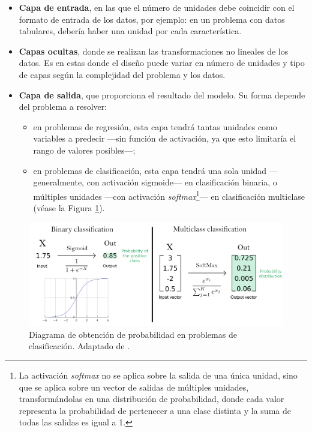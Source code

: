 \begin{itemize}

    \item \textbf{Capa de entrada}, en las que el número de unidades debe coincidir con el formato de entrada 
    de los datos, por ejemplo: en un problema con datos tabulares, debería haber una unidad por cada 
    característica.
    
    \item \textbf{Capas ocultas}, donde se realizan las transformaciones no lineales de los datos. Es en estas 
    donde el diseño puede variar en número de unidades y tipo de capas según la complejidad del problema y los 
    datos.
    
    \item \textbf{Capa de salida}, que proporciona el resultado del modelo. Su forma depende del problema a 
    resolver: 
    
    \begin{itemize}
        
        \item en problemas de regresión, esta capa tendrá tantas unidades como variables a predecir ---sin 
        función de activación, ya que esto limitaría el rango de valores posibles---;
        
        \item en problemas de clasificación, esta capa tendrá una sola unidad ---generalmente, con activación 
        sigmoide--- en clasificación binaria, o múltiples unidades ---con activación 
        \textit{softmax}\footnote{
            La activación \textit{softmax} no se aplica sobre la salida de una única unidad, sino que se 
            aplica sobre un vector de salidas de múltiples unidades, transformándolas en una distribución de 
            probabilidad, donde cada valor representa la probabilidad de pertenecer a una clase distinta y la 
            suma de todas las salidas es igual a 1.
        }--- en clasificación multiclase (véase la Figura \ref{fig:activation_func_classification}).
    \end{itemize}

\end{itemize}

\begin{figure}[h]
    \centering
    \includegraphics[width=\textwidth]{capitulos/cap_02/imagenes/ActivationFuncClassification.png}
    \caption{
        Diagrama de obtención de probabilidad en problemas de clasificación. 
        Adaptado de \cite{furnieles2022sigmoidandsoftmax}.
    } 
    \label{fig:activation_func_classification}
\end{figure}

